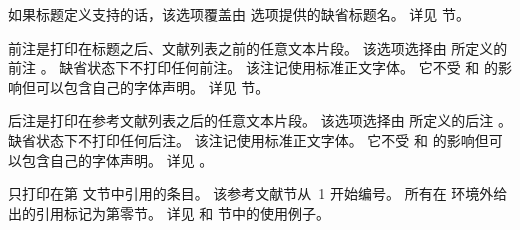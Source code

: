 \begin{optionlist*}
如果标题定义支持的话，该选项覆盖由  选项提供的缺省标题名。
详见  节。



前注是打印在标题之后、文献列表之前的任意文本片段。
该选项选择由  所定义的前注 。
缺省状态下不打印任何前注。
该注记使用标准正文字体。
它不受  和  的影响但可以包含自己的字体声明。
详见  节。



后注是打印在参考文献列表之后的任意文本片段。
该选项选择由  所定义的后注 。
缺省状态下不打印任何后注。
该注记使用标准正文字体。
它不受  和  的影响但可以包含自己的字体声明。
详见 。



只打印在第  文节中引用的条目。
该参考文献节从~1 开始编号。
所有在  环境外给出的引用标记为第零节。
详见  和  节中的使用例子。




\end{optionlist*}
